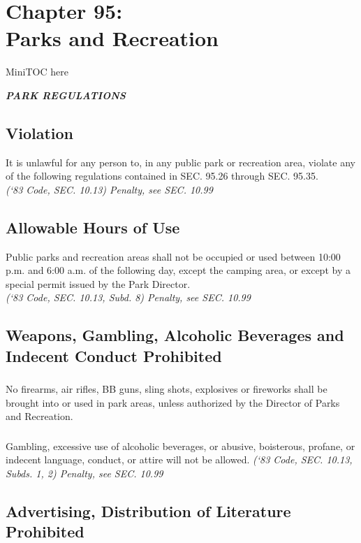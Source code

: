 \documentclass[code.tex]{subfiles}
\begin{document}
\chapter*{Chapter 95: \\
	Parks and Recreation}

MiniTOC here
\pagebreak

\begin{center}
\emph{\textbf{\LARGE{PARK REGULATIONS}}}
\end{center}
\setcounter{section}{24}
\section{Violation}
It is unlawful for any person to, in any public park or recreation area, violate any of the following regulations contained in SEC. 95.26 through SEC. 95.35.\\
\emph{(‘83 Code, SEC. 10.13)  Penalty, see SEC. 10.99}
\section{Allowable Hours of Use}
Public parks and recreation areas shall not be occupied or used between 10:00 p.m. and 6:00 a.m. of the following day, except the camping area, or except by a special permit issued by the Park Director.\\
\emph{(‘83 Code, SEC. 10.13, Subd. 8) Penalty, see SEC. 10.99}
\section{Weapons, Gambling, Alcoholic Beverages and Indecent Conduct Prohibited}
\subsection{}
No firearms, air rifles, BB guns, sling shots, explosives or fireworks shall be brought into or used in park areas, unless authorized by the Director of Parks and Recreation.
\subsection{}
Gambling, excessive use of alcoholic beverages, or abusive, boisterous, profane, or indecent language, conduct, or attire will not be allowed.
\emph{(‘83 Code, SEC. 10.13, Subds. 1, 2)  Penalty, see SEC. 10.99}
\section{Advertising, Distribution of Literature Prohibited}
\end{document}
